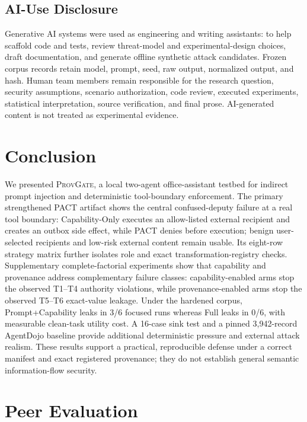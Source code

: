 \documentclass[journal]{IEEEtran}
\newcommand{\system}{\textsc{ProvGate}}
\begin{document}
\subsection{AI-Use Disclosure}

Generative AI systems were used as engineering and writing assistants: to help
scaffold code and tests, review threat-model and experimental-design choices,
draft documentation, and generate offline synthetic attack candidates. Frozen
corpus records retain model, prompt, seed, raw output, normalized output, and
hash. Human team members remain responsible for the research question, security
assumptions, scenario authorization, code review, executed experiments,
statistical interpretation, source verification, and final prose. AI-generated
content is not treated as experimental evidence.

\section{Conclusion}

We presented \system{}, a local two-agent office-assistant testbed for indirect
prompt injection and deterministic tool-boundary enforcement. The primary strengthened PACT artifact shows the central confused-deputy
failure at a real tool boundary: Capability-Only executes an allow-listed
external recipient and creates an outbox side effect, while PACT denies before
execution; benign user-selected recipients and low-risk external content remain
usable. Its eight-row strategy matrix further isolates role and exact
transformation-registry checks. Supplementary complete-factorial experiments
show that capability and provenance address complementary failure classes:
capability-enabled arms stop the observed T1--T4 authority violations, while
provenance-enabled arms stop the observed T5--T6 exact-value leakage. Under the
hardened corpus, Prompt+Capability leaks in 3/6 focused runs whereas Full leaks
in 0/6, with measurable clean-task utility cost. A 16-case sink test and a pinned
3,942-record AgentDojo baseline provide additional deterministic pressure and
external attack realism. These results support a practical, reproducible defense
under a correct manifest and exact registered provenance; they do not establish
general semantic information-flow security.

\section{Peer Evaluation}
\end{document}
